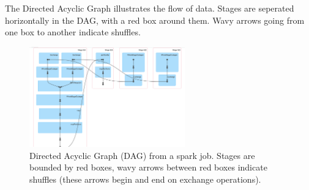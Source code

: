 \documentclass{article}
\begin{document}
The Directed Acyclic Graph illustrates the flow of data. Stages are seperated horizontally in the DAG, with a red box around them. Wavy arrows going from one box to another indicate shuffles.

\begin{figure}[hbpt]
    \includegraphics[width=0.6\textwidth]{DAG.png}
    \caption{Directed Acyclic Graph (DAG) from a spark job. Stages are bounded by red boxes, wavy arrows between red boxes indicate shuffles (these arrows begin and end on exchange operations). }
    \label{fig_dag_example}
\end{figure}












\end{document}
